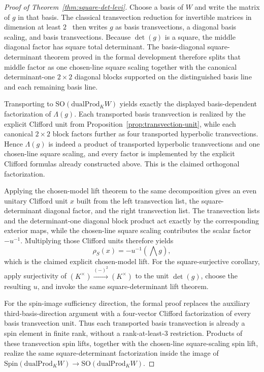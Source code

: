 \documentclass{birkjour}
\theoremstyle{plain}
\theoremstyle{definition}
\theoremstyle{remark}
\newcommand{\Spin}{\mathrm{Spin}}
\newcommand{\SO}{\mathrm{SO}}
\newcommand{\dualProd}{\mathrm{dualProd}}
\begin{document}
\begin{proof}[Proof of Theorem~\ref{thm:square-det-levi}]
Choose a basis of $W$ and write the matrix of $g$ in that basis. The classical
transvection reduction for invertible matrices in dimension at least
$2$~\cite[Ch.~IV]{Artin1957GeometricAlgebra} then writes $g$ as basis
transvections, a diagonal basis scaling, and basis transvections. Because
$\det(g)$ is a square, the middle diagonal factor has square total determinant.
The basis-diagonal square-determinant theorem proved in the formal development
therefore splits that middle factor as one chosen-line square scaling together
with the canonical determinant-one $2\times2$ diagonal blocks supported on the
distinguished basis line and each remaining basis line.

Transporting to $\SO(\dualProd_K W)$ yields exactly the displayed basis-dependent
factorization of $\Lambda(g)$. Each transported basis transvection is realized
by the explicit Clifford unit from Proposition~\ref{prop:transvection-unit},
while each canonical $2\times2$ block factors further as four transported
hyperbolic transvections. Hence $\Lambda(g)$ is indeed a product of transported
hyperbolic transvections and one chosen-line square scaling, and every factor is
implemented by the explicit Clifford formulas already constructed above. This is
the claimed orthogonal factorization.

Applying the chosen-model lift theorem to the same decomposition gives an even
unitary Clifford unit $x$ built from the left transvection list, the
square-determinant diagonal factor, and the right transvection list. The
transvection lists and the determinant-one diagonal block product act exactly by
the corresponding exterior maps, while the chosen-line square scaling
contributes the scalar factor $-u^{-1}$. Multiplying those Clifford units
therefore yields
\[
  \rho_S(x)=-u^{-1}(\bigwedge g),
\]
which is the claimed explicit chosen-model lift.
For the square-surjective corollary, apply surjectivity of
\((K^\times)\xrightarrow{(-)^2}(K^\times)\) to the unit \(\det(g)\), choose
the resulting $u$, and invoke the same square-determinant lift theorem.

For the spin-image sufficiency direction, the formal proof replaces the auxiliary
third-basis-direction argument with a four-vector Clifford factorization of every
basis transvection unit. Thus each transported basis transvection is already a
spin element in finite rank, without a rank-at-least-$3$ restriction. Products
of these transvection spin lifts, together with the chosen-line square-scaling
spin lift, realize the same square-determinant factorization inside the image of
\(\Spin(\dualProd_K W)\to\SO(\dualProd_K W)\).


\end{proof}
\end{document}
